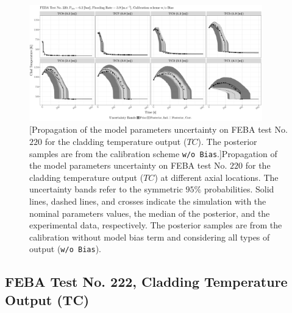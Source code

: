 \clearpage
\begin{figure}
	\centering
	\includegraphics[width=0.90\textwidth]{../figures/chapter5/figures/plotTraceUQPosteriorAllNoDiscNoBCTC220}
		[Propagation of the model parameters uncertainty on FEBA test No. $220$ for the cladding temperature output ($TC$). The posterior samples are from the calibration scheme \texttt{w/o Bias}.]{Propagation of the model parameters uncertainty on FEBA test No. $220$ for the cladding temperature output ($TC$) at different axial locations. The uncertainty bands refer to the symmetric $95\%$ probabilities. Solid lines, dashed lines, and crosses indicate the simulation with the nominal parameters values, the median of the posterior, and the experimental data, respectively. The posterior samples are from the calibration without model bias term and considering all types of output (\texttt{w/o Bias}).}
	\label{fig:ch5_plot_trace_uq_post_tc_220_nodisc}
\end{figure}
\clearpage

\subsection{FEBA Test No. 222, Cladding Temperature Output (TC)}\label{app:tbl_results_uq_post_tc_222}

